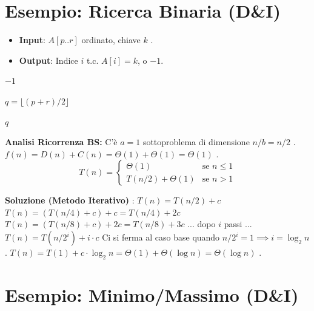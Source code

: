 \section{Esempio: Ricerca Binaria (D\&I) }

\begin{example}
\begin{itemize}
    \item \textbf{Input}: $A[p..r]$ ordinato, chiave $k$ .
    \item \textbf{Output}: Indice $i$ t.c. $A[i]=k$, o $-1$.
\end{itemize}
\end{example}

\begin{algorithmic}[1]
     
        \State \Return $-1$
    \EndIf
    
    \State $q = \lfloor (p+r)/2 \rfloor$ 
    
     
        \State \Return $q$
     
        \State \Return {} 
    \Else
        \State \Return {} 
    \EndIf
    
\EndProcedure
\end{algorithmic}


\begin{observation}
\textbf{Analisi Ricorrenza BS: }
C'è $a=1$ sottoproblema di dimensione $n/b = n/2$ .
$f(n) = D(n) + C(n) = \Theta(1) + \Theta(1) = \Theta(1)$ .
$$ T(n) = \begin{cases} \Theta(1) & \text{se } n \le 1 \\ T(n/2) + \Theta(1) & \text{se } n > 1 \end{cases} $$

\textbf{Soluzione (Metodo Iterativo)} :
$T(n) = T(n/2) + c$ 
$T(n) = (T(n/4) + c) + c = T(n/4) + 2c$ 
$T(n) = (T(n/8) + c) + 2c = T(n/8) + 3c$ 
... dopo $i$ passi ...
$T(n) = T(n/2^i) + i \cdot c$ 
Ci si ferma al caso base quando $n/2^i = 1 \implies i = \log_2 n$ .
$T(n) = T(1) + c \cdot \log_2 n = \Theta(1) + \Theta(\log n) = \Theta(\log n)$ .
\end{observation}

\section{Esempio: Minimo/Massimo (D\&I) }

